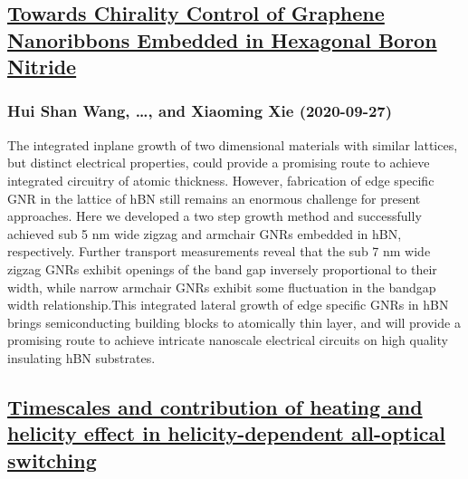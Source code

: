 \subsection*{\href{http://arxiv.org/abs/2009.12822v1}{Towards Chirality Control of Graphene Nanoribbons Embedded in Hexagonal  Boron Nitride}}
\subsubsection*{Hui Shan Wang, \dots, and Xiaoming Xie (2020-09-27)}
The integrated inplane growth of two dimensional materials with similar
lattices, but distinct electrical properties, could provide a promising route
to achieve integrated circuitry of atomic thickness. However, fabrication of
edge specific GNR in the lattice of hBN still remains an enormous challenge for
present approaches. Here we developed a two step growth method and successfully
achieved sub 5 nm wide zigzag and armchair GNRs embedded in hBN, respectively.
Further transport measurements reveal that the sub 7 nm wide zigzag GNRs
exhibit openings of the band gap inversely proportional to their width, while
narrow armchair GNRs exhibit some fluctuation in the bandgap width
relationship.This integrated lateral growth of edge specific GNRs in hBN brings
semiconducting building blocks to atomically thin layer, and will provide a
promising route to achieve intricate nanoscale electrical circuits on high
quality insulating hBN substrates.

\subsection*{\href{http://arxiv.org/abs/2009.12816v1}{Timescales and contribution of heating and helicity effect in  helicity-dependent all-optical switching}}
